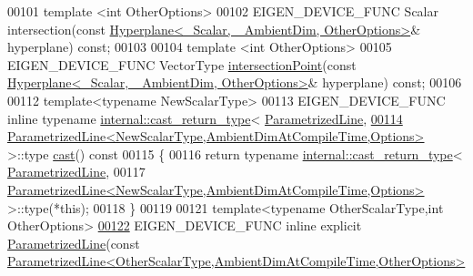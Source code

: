 \begin{DoxyCode}
00101   \textcolor{keyword}{template} <\textcolor{keywordtype}{int} OtherOptions>
00102   EIGEN\_DEVICE\_FUNC Scalar intersection(\textcolor{keyword}{const} 
      \hyperlink{group___geometry___module_class_eigen_1_1_hyperplane}{Hyperplane<\_Scalar, \_AmbientDim, OtherOptions>}& hyperplane) \textcolor{keyword}{
      const};
00103   
00104   \textcolor{keyword}{template} <\textcolor{keywordtype}{int} OtherOptions>
00105   EIGEN\_DEVICE\_FUNC VectorType \hyperlink{group___geometry___module_a9319102677fc48d2208c949f448f4829}{intersectionPoint}(\textcolor{keyword}{const} 
      \hyperlink{group___geometry___module_class_eigen_1_1_hyperplane}{Hyperplane<\_Scalar, \_AmbientDim, OtherOptions>}& hyperplane) \textcolor{keyword}{
      const};
00106 
00112   \textcolor{keyword}{template}<\textcolor{keyword}{typename} NewScalarType>
00113   EIGEN\_DEVICE\_FUNC \textcolor{keyword}{inline} \textcolor{keyword}{typename} \hyperlink{struct_eigen_1_1internal_1_1cast__return__type}{internal::cast\_return\_type}<
      \hyperlink{group___geometry___module_a7c23f36d93cf3b3c2b37fd9f9eda5685}{ParametrizedLine},
\hyperlink{group___geometry___module_a2f48ba47cd487a3550b4371f01c3271c}{00114}            \hyperlink{group___geometry___module_class_eigen_1_1_parametrized_line}{ParametrizedLine<NewScalarType,AmbientDimAtCompileTime,Options>}
       >::type \hyperlink{group___geometry___module_a2f48ba47cd487a3550b4371f01c3271c}{cast}()\textcolor{keyword}{ const}
00115 \textcolor{keyword}{  }\{
00116     \textcolor{keywordflow}{return} \textcolor{keyword}{typename} \hyperlink{struct_eigen_1_1internal_1_1cast__return__type}{internal::cast\_return\_type}<
      \hyperlink{group___geometry___module_a7c23f36d93cf3b3c2b37fd9f9eda5685}{ParametrizedLine},
00117                     
      \hyperlink{group___geometry___module_class_eigen_1_1_parametrized_line}{ParametrizedLine<NewScalarType,AmbientDimAtCompileTime,Options>}
       >::type(*\textcolor{keyword}{this});
00118   \}
00119 
00121   \textcolor{keyword}{template}<\textcolor{keyword}{typename} OtherScalarType,\textcolor{keywordtype}{int} OtherOptions>
\hyperlink{group___geometry___module_a69aed1a96062648d4e61dce3b5fb896f}{00122}   EIGEN\_DEVICE\_FUNC \textcolor{keyword}{inline} \textcolor{keyword}{explicit} \hyperlink{group___geometry___module_a69aed1a96062648d4e61dce3b5fb896f}{ParametrizedLine}(\textcolor{keyword}{const} 
      \hyperlink{group___geometry___module_class_eigen_1_1_parametrized_line}{ParametrizedLine<OtherScalarType,AmbientDimAtCompileTime,OtherOptions>}

\end{DoxyCode}
